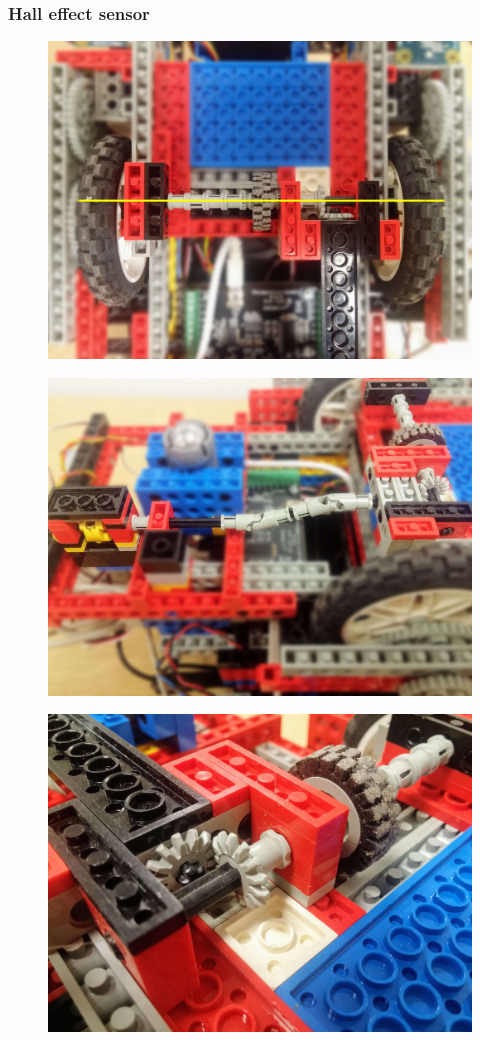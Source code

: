 \subsubsection{Hall effect sensor}

\begin{figure}[ht]
    \centering
    \includegraphics[width=0.7\linewidth]{res/robot-pics/pivot-wheel-layout.jpg}
    \caption{}
    \label{fig:}
\end{figure}

\begin{figure}[ht]
    \centering
    \includegraphics[width=0.7\linewidth]{res/robot-pics/pivot-wheel-sensor.jpg}
    \caption{}
    \label{fig:}
\end{figure}

\begin{figure}[ht]
    \centering
    \includegraphics[width=0.7\linewidth]{res/robot-pics/pivot-wheel-axel-transfer.jpg}
    \caption{}
    \label{fig:}
\end{figure}

